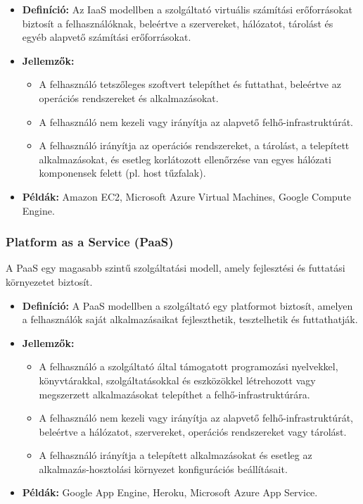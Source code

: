 \documentclass[a4paper,12pt]{article}
\begin{document}
    \begin{itemize}
        \item \textbf{Definíció:} Az IaaS modellben a szolgáltató virtuális számítási erőforrásokat biztosít a felhasználóknak, beleértve a szervereket, hálózatot, tárolást és egyéb alapvető számítási erőforrásokat.

        \item \textbf{Jellemzők:}
        \begin{itemize}
            \item A felhasználó tetszőleges szoftvert telepíthet és futtathat, beleértve az operációs rendszereket és alkalmazásokat.
            \item A felhasználó nem kezeli vagy irányítja az alapvető felhő-infrastruktúrát.
            \item A felhasználó irányítja az operációs rendszereket, a tárolást, a telepített alkalmazásokat, és esetleg korlátozott ellenőrzése van egyes hálózati komponensek felett (pl. host tűzfalak).
        \end{itemize}

        \item \textbf{Példák:} Amazon EC2, Microsoft Azure Virtual Machines, Google Compute Engine.
    \end{itemize}

    \subsubsection{Platform as a Service (PaaS)}

    A PaaS egy magasabb szintű szolgáltatási modell, amely fejlesztési és futtatási környezetet biztosít.

    \begin{itemize}
        \item \textbf{Definíció:} A PaaS modellben a szolgáltató egy platformot biztosít, amelyen a felhasználók saját alkalmazásaikat fejleszthetik, tesztelhetik és futtathatják.

        \item \textbf{Jellemzők:}
        \begin{itemize}
            \item A felhasználó a szolgáltató által támogatott programozási nyelvekkel, könyvtárakkal, szolgáltatásokkal és eszközökkel létrehozott vagy megszerzett alkalmazásokat telepíthet a felhő-infrastruktúrára.
            \item A felhasználó nem kezeli vagy irányítja az alapvető felhő-infrastruktúrát, beleértve a hálózatot, szervereket, operációs rendszereket vagy tárolást.
            \item A felhasználó irányítja a telepített alkalmazásokat és esetleg az alkalmazás-hosztolási környezet konfigurációs beállításait.
        \end{itemize}

        \item \textbf{Példák:} Google App Engine, Heroku, Microsoft Azure App Service.
    \end{itemize}
\end{document}

